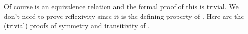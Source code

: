 Of course  is an equivalence relation and the formal proof of this is trivial. We don't need to prove reflexivity since it is the defining property of .  Here are the (trivial) proofs of symmetry and transitivity of .
\ccpad
\begin{code}%
\>[1]\AgdaSpace{}%
\AgdaSymbol{:}\AgdaSpace{}%
\AgdaSymbol{(}\AgdaSpace{}%
\AgdaSpace{}%
\AgdaSymbol{:}\AgdaSpace{}%
\AgdaSymbol{)}\AgdaSpace{}%
\AgdaSpace{}%
\AgdaSpace{}%
\AgdaSpace{}%
\AgdaSpace{}%
\AgdaSpace{}%
\AgdaSpace{}%
\AgdaSpace{}%
\<%
\\
%
\>[1]\AgdaSpace{}%
\AgdaSymbol{\AgdaUnderscore{}}\AgdaSpace{}%
\AgdaSymbol{\AgdaUnderscore{}}\AgdaSpace{}%
\AgdaSpace{}%
\AgdaSymbol{=}\AgdaSpace{}%
\<%
\\
%
\\[\AgdaEmptyExtraSkip]%
%
\>[1]\AgdaSpace{}%
\AgdaSymbol{:}\AgdaSpace{}%
\AgdaSymbol{\{}\AgdaSpace{}%
\AgdaSpace{}%
\AgdaSymbol{:}\AgdaSpace{}%
\AgdaSymbol{\}}\AgdaSpace{}%
\AgdaSpace{}%
\AgdaSpace{}%
\AgdaSpace{}%
\AgdaSpace{}%

\end{code}
